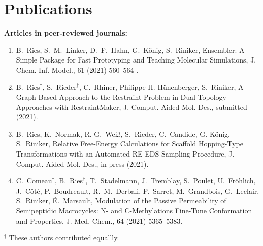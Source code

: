 \chapter{Publications}
\noindent \textbf{Articles in peer-reviewed journals:}
\begin{enumerate}
\item B.\ Ries, S.\ M.\ Linker, D.\ F.\ Hahn, G.\ K\"onig, S.\ Riniker, Ensembler: A Simple Package for Fast Prototyping and Teaching Molecular Simulations, {J. Chem. Inf. Model.}, {61} (2021) 560--564 .

\item B.\ Ries$^\dag$, S.\ Rieder$^\dag$, C.\ Rhiner, Philippe H. H\"unenberger, S.\ Riniker, A Graph-Based Approach to the Restraint Problem in Dual Topology Approaches with RestraintMaker, {J. Comput.-Aided Mol. Des.}, submitted (2021).

\item B.\ Ries, K.\ Normak, R. G.\ Wei\ss, S.\ Rieder, C.\ Candide, G. K\"onig, S.\ Riniker, Relative Free-Energy Calculations for Scaffold Hopping-Type Transformations with an Automated RE-EDS Sampling Procedure, {J. Comput.-Aided Mol. Des.}, in press (2021).

\item C.\ Comeau$^\dag$, B.\ Ries$^\dag$, T.\ Stadelmann, J.\ Tremblay, S.\ Poulet, U.\ Fröhlich, J.\ Côté, P.\ Boudreault, R.\ M.\ Derbali, P.\ Sarret, M.\ Grandbois, G.\ Leclair, S.\ Riniker, \'E.\ Marsault, Modulation of the Passive Permeability of Semipeptidic Macrocycles: N- and C-Methylations Fine-Tune Conformation and Properties, {J. Med. Chem.}, {64} (2021) 5365--5383.
\end{enumerate}
\noindent $^\dag$ These authors contributed equallly. \\

